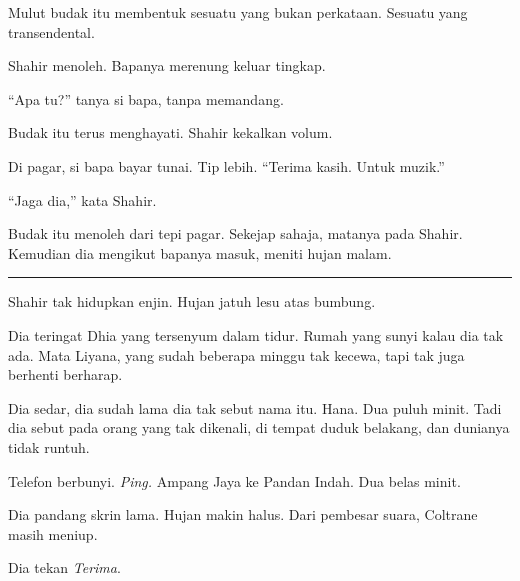 \documentclass[
  11pt,
  a5paper,
  openany,
  oneside]{book}
\begin{document}
Mulut budak itu membentuk sesuatu yang bukan perkataan. Sesuatu yang
transendental.

Shahir menoleh. Bapanya merenung keluar tingkap.

``Apa tu?'' tanya si bapa, tanpa memandang.

Budak itu terus menghayati. Shahir kekalkan volum.

Di pagar, si bapa bayar tunai. Tip lebih. ``Terima kasih. Untuk muzik.''

``Jaga dia,'' kata Shahir.

Budak itu menoleh dari tepi pagar. Sekejap sahaja, matanya pada Shahir.
Kemudian dia mengikut bapanya masuk, meniti hujan malam.

\begin{center}\rule{0.5\linewidth}{0.5pt}\end{center}

Shahir tak hidupkan enjin. Hujan jatuh lesu atas bumbung.

Dia teringat Dhia yang tersenyum dalam tidur. Rumah yang sunyi kalau dia
tak ada. Mata Liyana, yang sudah beberapa minggu tak kecewa, tapi tak
juga berhenti berharap.

Dia sedar, dia sudah lama dia tak sebut nama itu. Hana. Dua puluh minit.
Tadi dia sebut pada orang yang tak dikenali, di tempat duduk belakang,
dan dunianya tidak runtuh.

Telefon berbunyi. \emph{Ping.} Ampang Jaya ke Pandan Indah. Dua belas
minit.

Dia pandang skrin lama. Hujan makin halus. Dari pembesar suara, Coltrane
masih meniup.

Dia tekan \emph{Terima}.

\backmatter
\end{document}
